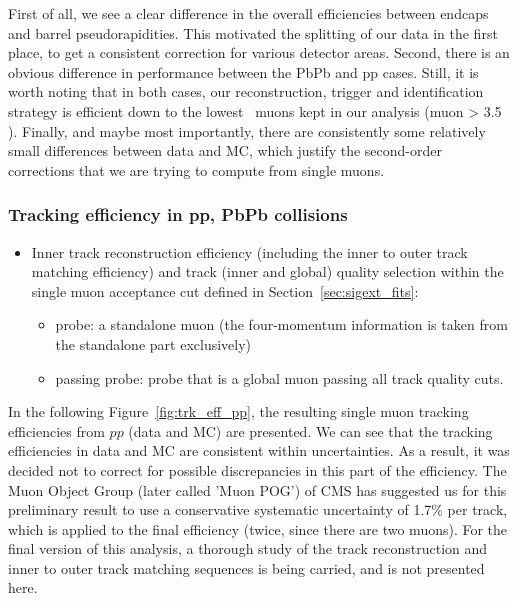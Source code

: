 First of all, we see a clear difference in the overall efficiencies
between endcaps and barrel pseudorapidities. This motivated the
splitting of our data in the first place, to get a consistent
correction for various detector areas. Second, there is an obvious
difference in performance between the PbPb and pp cases. Still, it is worth noting that in both cases, our
reconstruction, trigger and identification strategy is efficient down
to the lowest \pt\ muons kept in our analysis (muon \pt > 3.5 \GeVc).
Finally, and maybe most importantly, there are consistently some
relatively small differences between data and MC, which justify the
second-order corrections that we are trying to compute from single
muons.

\subsubsection*{Tracking efficiency in pp, PbPb collisions}
\label{subsec:def_tracking}
\begin{itemize}
\item Inner track reconstruction efficiency (including the inner to
  outer track matching efficiency) and track (inner and global) quality selection within the single muon acceptance cut defined in Section~\ref{sec:sigext_fits}:
  \begin{itemize}
  \item probe: a standalone muon (the four-momentum information is taken from the
    standalone part exclusively)
  \item passing probe: probe that is a global muon passing all track quality cuts.
  \end{itemize}

\end{itemize}

In the following Figure~\ref{fig:trk_eff_pp}, the resulting
single muon tracking efficiencies from $pp$ (data and MC) are
presented. We can see that the tracking efficiencies in data and
MC are consistent within uncertainties. As a result, it was
decided not to correct for possible discrepancies in this part of the
efficiency. The Muon Object Group (later called 'Muon POG') of CMS has
suggested us for this preliminary result to use a conservative
systematic uncertainty of 1.7\% per track, which is applied to the
final efficiency (twice, since there are two muons). For the final
version of this analysis, a thorough study of the track reconstruction
and inner to outer track matching sequences is being carried, and is not presented here.%

